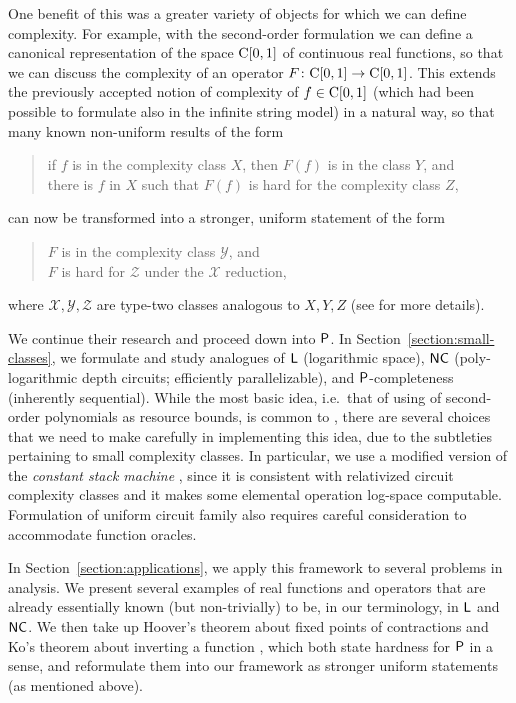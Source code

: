 \documentclass[envcountsame,orivec,oribibl]{llncs}
\begin{document}
One benefit of this was
a greater variety of objects for which we can define complexity. 
For example, with the second-order formulation
we can define a canonical representation of the space $\mathrm C [0, 1]$
of continuous real functions, 
so that we can discuss the complexity of an
operator $F \colon \mathrm C [0, 1] \to \mathrm C [0, 1]$. 
This extends the previously accepted notion of 
complexity of $f \in \mathrm C [0, 1]$
(which had been possible to formulate also in the infinite string model)
in a natural way, so that many known non-uniform results of the form
\begin{quote}
 if $f$ is in the complexity class $X$,
 then $F(f)$ is in the class $Y$, and \\
 there is $f$ in $X$ such that $F(f)$ is hard for
 the complexity class $Z$, 
\end{quote}
can now be transformed into a stronger, uniform statement of the form
\begin{quote}
 $F$ is in the complexity class $\mathcal Y$, and \\
 $F$ is hard for $\mathcal Z$ under the $\mathcal X$ reduction,
\end{quote}
where $\mathcal{X, Y, Z}$ are type-two classes analogous to ${X, Y, Z}$ 
(see \cite{kawamura2012complexity} for more details).

We continue their research and proceed down into $\mathsf{P}$. 
In Section~\ref{section:small-classes}, 
we formulate and study analogues of 
$\mathsf{L}$ (logarithmic space), 
$\mathsf{NC}$ (poly-logarithmic depth circuits; efficiently parallelizable), 
and 
$\mathsf{P}$-completeness (inherently sequential). 
While the most basic idea, 
i.e.\ that of using of second-order polynomials as resource bounds, 
is common to \cite{kawamura2012complexity}, 
there are several choices that we need to make carefully
in implementing this idea, 
due to the subtleties pertaining to small complexity classes. 
In particular, 
we use a modified version of 
the \emph{constant stack machine} \cite{aehlig2007relativizing}, 
since it is consistent with relativized circuit complexity classes 
and it makes some elemental operation log-space computable.
Formulation of uniform circuit family
also requires careful consideration to 
accommodate function oracles. 

In Section~\ref{section:applications}, 
we apply this framework to several problems in analysis.
We present several examples of real functions and operators 
that are already essentially known (but non-trivially) to be, 
in our terminology, 
in $\mathsf{L}$ and $\mathsf{NC}$. 
We then take up
Hoover's theorem about fixed points of contractions \cite{hoover1991real}
and Ko's theorem about inverting a function \cite{ko1991complexity}, 
which both state hardness for $\mathsf{P}$ in a sense, 
and reformulate them into our framework
as stronger uniform statements (as mentioned above).
\end{document}
